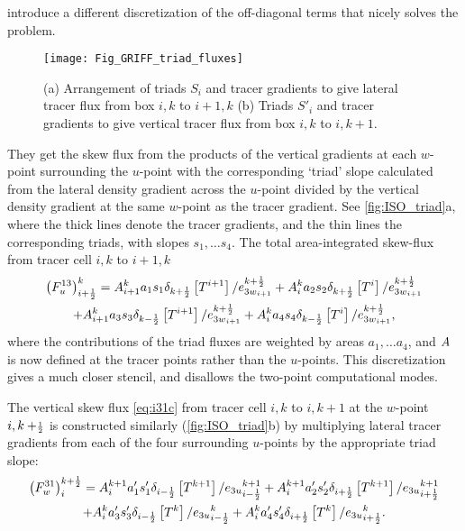 \documentclass[../main/NEMO_manual]{subfiles}
\begin{document}
\citep{Griffies_al_JPO98} introduce a different discretization of the off-diagonal terms that
nicely solves the problem.
\begin{figure}[tb]
  \begin{center}
    \texttt{[image: Fig\_GRIFF\_triad\_fluxes]}
    \caption{
      \protect\label{fig:ISO_triad}
      (a) Arrangement of triads $S_i$ and tracer gradients to
      give lateral tracer flux from box $i,k$ to $i+1,k$
      (b) Triads $S'_i$ and tracer gradients to give vertical tracer flux from
      box $i,k$ to $i,k+1$.
    }
  \end{center}
\end{figure}
They get the skew flux from the products of the vertical gradients at each $w$-point surrounding the $u$-point with
the corresponding `triad' slope calculated from the lateral density gradient across the $u$-point divided by
the vertical density gradient at the same $w$-point as the tracer gradient.
See \autoref{fig:ISO_triad}a, where the thick lines denote the tracer gradients,
and the thin lines the corresponding triads, with slopes $s_1, \dotsc s_4$.
The total area-integrated skew-flux from tracer cell $i,k$ to $i+1,k$
\begin{multline}
  \label{eq:i13}
  \left( F_u^{13}  \right)_{i+\frac{1}{2}}^k = {A}_{i+1}^k a_1 s_1
  \delta_{k+\frac{1}{2}} \left[ T^{i+1}
  \right]/e_{{3w}_{i+1}}^{k+\frac{1}{2}}  + {A} _i^k a_2 s_2 \delta
  _{k+\frac{1}{2}} \left[ T^i
  \right]/e_{{3w}_{i+1}}^{k+\frac{1}{2}} \\
  +{A} _{i+1}^k a_3 s_3 \delta_{k-\frac{1}{2}} \left[ T^{i+1}
  \right]/e_{{3w}_{i+1}}^{k+\frac{1}{2}}  +{A} _i^k a_4 s_4 \delta
  _{k-\frac{1}{2}} \left[ T^i \right]/e_{{3w}_{i+1}}^{k+\frac{1}{2}},
\end{multline}
where the contributions of the triad fluxes are weighted by areas $a_1, \dotsc a_4$,
and ${A}$ is now defined at the tracer points rather than the $u$-points.
This discretization gives a much closer stencil, and disallows the two-point computational modes.

The vertical skew flux \autoref{eq:i31c} from tracer cell $i,k$ to $i,k+1$ at
the $w$-point $i,k+\scriptstyle\frac{1}{2}$ is constructed similarly (\autoref{fig:ISO_triad}b) by
multiplying lateral tracer gradients from each of the four surrounding $u$-points by the appropriate triad slope:
\begin{multline}
  \label{eq:i31}
  \left( F_w^{31} \right) _i ^{k+\frac{1}{2}} =  {A}_i^{k+1} a_{1}'
  s_{1}' \delta_{i-\frac{1}{2}} \left[ T^{k+1} \right]/{e_{3u}}_{i-\frac{1}{2}}^{k+1}
  +{A}_i^{k+1} a_{2}' s_{2}' \delta_{i+\frac{1}{2}} \left[ T^{k+1} \right]/{e_{3u}}_{i+\frac{1}{2}}^{k+1} \\
  + {A}_i^k a_{3}' s_{3}' \delta_{i-\frac{1}{2}} \left[ T^k\right]/{e_{3u}}_{i-\frac{1}{2}}^k
  +{A}_i^k a_{4}' s_{4}' \delta_{i+\frac{1}{2}} \left[ T^k \right]/{e_{3u}}_{i+\frac{1}{2}}^k.
\end{multline}
\end{document}
